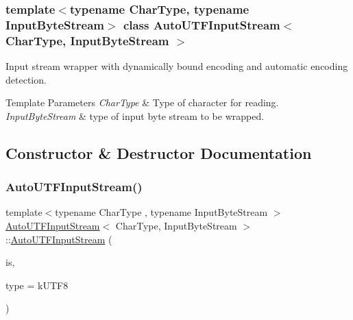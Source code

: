 \subsubsection*{template$<$typename Char\+Type, typename Input\+Byte\+Stream$>$\newline
class Auto\+U\+T\+F\+Input\+Stream$<$ Char\+Type, Input\+Byte\+Stream $>$}

Input stream wrapper with dynamically bound encoding and automatic encoding detection. 


\begin{DoxyTemplParams}{Template Parameters}
{\em Char\+Type} & Type of character for reading. \\
\hline
{\em Input\+Byte\+Stream} & type of input byte stream to be wrapped. \\
\hline
\end{DoxyTemplParams}


\subsection{Constructor \& Destructor Documentation}
\mbox{\label{classAutoUTFInputStream_a83837fced0971ba26dd9a8ec1575abb0}} 
\subsubsection{\texorpdfstring{Auto\+U\+T\+F\+Input\+Stream()}{AutoUTFInputStream()}\hspace{0.1cm}{\footnotesize\ttfamily [1/2]}}
{\footnotesize\ttfamily template$<$typename Char\+Type , typename Input\+Byte\+Stream $>$ \\
\hyperlink{classAutoUTFInputStream}{Auto\+U\+T\+F\+Input\+Stream}$<$ Char\+Type, Input\+Byte\+Stream $>$\+::\hyperlink{classAutoUTFInputStream}{Auto\+U\+T\+F\+Input\+Stream} (\begin{DoxyParamCaption}\item[{Input\+Byte\+Stream \&}]{is,  }\item[{U\+T\+F\+Type}]{type = {\ttfamily kUTF8} }\end{DoxyParamCaption})\hspace{0.3cm}{\ttfamily [inline]}}



